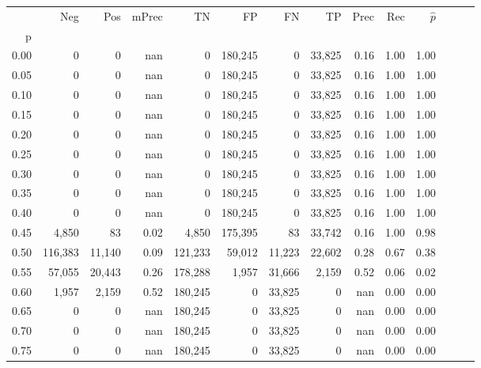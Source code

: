 \begin{tabular}{rrrrrrrrrrrrrr}
\toprule
{} &      Neg &     Pos & mPrec &       TN &       FP &      FN &      TP &  Prec &   Rec & $\hat{p}$ \\
p    &          &         &       &          &          &         &         &       &       &           \\
\midrule
0.00 &        0 &       0 &   nan &        0 &  180,245 &       0 &  33,825 &  0.16 &  1.00 &      1.00 \\
0.05 &        0 &       0 &   nan &        0 &  180,245 &       0 &  33,825 &  0.16 &  1.00 &      1.00 \\
0.10 &        0 &       0 &   nan &        0 &  180,245 &       0 &  33,825 &  0.16 &  1.00 &      1.00 \\
0.15 &        0 &       0 &   nan &        0 &  180,245 &       0 &  33,825 &  0.16 &  1.00 &      1.00 \\
0.20 &        0 &       0 &   nan &        0 &  180,245 &       0 &  33,825 &  0.16 &  1.00 &      1.00 \\
0.25 &        0 &       0 &   nan &        0 &  180,245 &       0 &  33,825 &  0.16 &  1.00 &      1.00 \\
0.30 &        0 &       0 &   nan &        0 &  180,245 &       0 &  33,825 &  0.16 &  1.00 &      1.00 \\
0.35 &        0 &       0 &   nan &        0 &  180,245 &       0 &  33,825 &  0.16 &  1.00 &      1.00 \\
0.40 &        0 &       0 &   nan &        0 &  180,245 &       0 &  33,825 &  0.16 &  1.00 &      1.00 \\
0.45 &    4,850 &      83 &  0.02 &    4,850 &  175,395 &      83 &  33,742 &  0.16 &  1.00 &      0.98 \\
0.50 &  116,383 &  11,140 &  0.09 &  121,233 &   59,012 &  11,223 &  22,602 &  0.28 &  0.67 &      0.38 \\
0.55 &   57,055 &  20,443 &  0.26 &  178,288 &    1,957 &  31,666 &   2,159 &  0.52 &  0.06 &      0.02 \\
0.60 &    1,957 &   2,159 &  0.52 &  180,245 &        0 &  33,825 &       0 &   nan &  0.00 &      0.00 \\
0.65 &        0 &       0 &   nan &  180,245 &        0 &  33,825 &       0 &   nan &  0.00 &      0.00 \\
0.70 &        0 &       0 &   nan &  180,245 &        0 &  33,825 &       0 &   nan &  0.00 &      0.00 \\
0.75 &        0 &       0 &   nan &  180,245 &        0 &  33,825 &       0 &   nan &  0.00 &      0.00 \\

\end{tabular}
